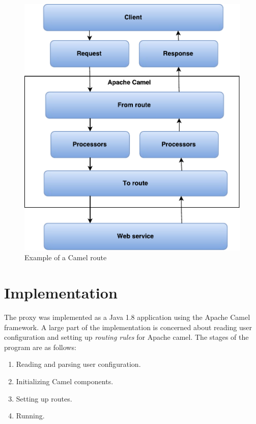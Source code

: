 \begin{figure}[h]
\centering
\includegraphics[scale=0.7]{images/camel_routes.pdf}
\caption{Example of a Camel route}
\label{figure:camel-route}
\end{figure}

\section{Implementation}

The proxy was implemented as a Java 1.8 application using the Apache Camel
framework. A large part of the implementation is concerned about reading user
configuration and setting up \textit{routing rules} for Apache camel. The stages
of the program are as follows:

\begin{enumerate}
    \item Reading and parsing user configuration.
    \item Initializing Camel components.
    \item Setting up routes.
    \item Running.
\end{enumerate}

